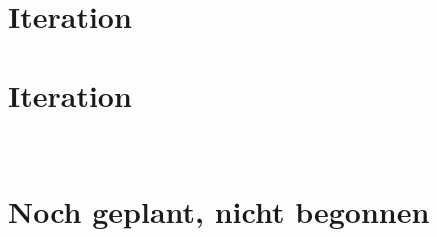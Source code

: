 \documentclass
[english,accentcolor=tud1c]
{tudreport}
\begin{document}
	\\
	\\

	\chapter{Iteration}
	

	\chapter{Iteration}
	\\
	

\chapter*{Noch geplant, nicht begonnen}

	\\
	\\
	\\
	\\
	
\end{document}
